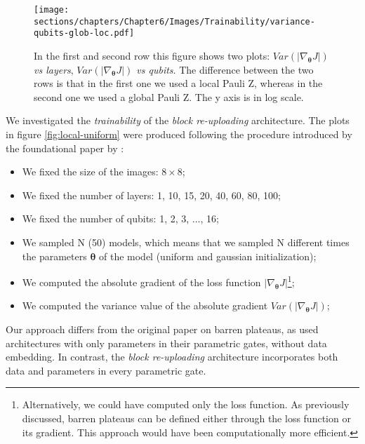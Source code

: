 \begin{figure}[h]
    \centering
    \texttt{[image: sections/chapters/Chapter6/Images/Trainability/variance-qubits-glob-loc.pdf]}
    \caption{In the first and second row this figure shows two plots: \textit{$Var(|\nabla_{\bm{\theta}}J|)$ vs layers}, 
    \textit{$Var(|\nabla_{\bm{\theta}}J|)$ vs qubits}.
    The difference between the two rows is that in the first one we used a local Pauli Z, whereas in the
    second one we used a global Pauli Z.
    The y axis is in log scale.}
\end{figure}




We investigated the \textit{trainability} of the \textit{block re-uploading} architecture. 
The plots in figure \ref{fig:local-uniform} were produced following the procedure introduced by 
the foundational paper by \cite{McClean_2018}:

\begin{itemize}
    \item We fixed the size of the images: $8\times8$;
    \item We fixed the number of layers: 1, 10, 15, 20, 40, 60, 80, 100;
    \item We fixed the number of qubits: 1, 2, 3, ..., 16;
    \item We sampled N (50) models, which means that we sampled N different times the parameters 
    $\bm{\theta}$ of the model (uniform and gaussian initialization);
    \item We computed the absolute gradient of the loss function $|\nabla_{\bm{\theta}}J|$\footnote[1]{
        Alternatively, we could have computed only the loss function. As previously discussed, 
        barren plateaus can be defined either through the loss function or its gradient. 
        This approach would have been computationally more efficient.
    };
    \item We computed the variance value of the absolute gradient $Var(|\nabla_{\bm{\theta}}J|)$;
\end{itemize}

Our approach differs from the original paper on barren plateaus, as \cite{McClean_2018} 
used architectures with only parameters in their parametric gates, without data embedding. 
In contrast, the \textit{block re-uploading} architecture incorporates both data and parameters 
in every parametric gate.\\

